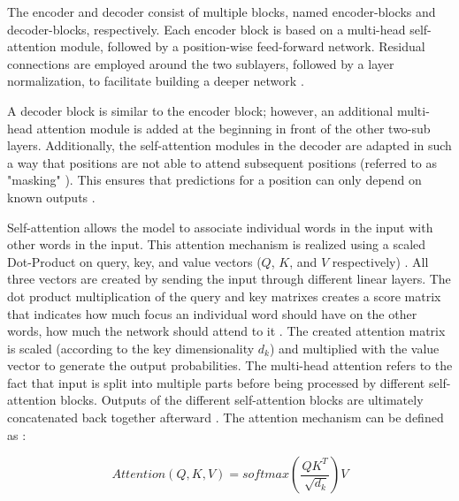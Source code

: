 The encoder and decoder consist of multiple blocks, named encoder-blocks and decoder-blocks, respectively.
Each encoder block is based on a multi-head self-attention module, followed by a position-wise feed-forward network.
Residual connections are employed around the two sublayers, followed by a layer normalization, to facilitate building a deeper network \cite{vaswani2017AttentionAllYou, lin2022SurveyTransformers}.

A decoder block is similar to the encoder block; however, an additional multi-head attention module is added at the beginning in front of the other two-sub layers.
Additionally, the self-attention modules in the decoder are adapted in such a way that positions are not able to attend subsequent positions (referred to as "masking" \cite[p. 3]{vaswani2017AttentionAllYou}).
This ensures that predictions for a position can only depend on known outputs \cite{vaswani2017AttentionAllYou, lin2022SurveyTransformers}.

Self-attention allows the model to associate individual words in the input with other words in the input.
This attention mechanism is realized using a scaled Dot-Product on query, key, and value vectors ($Q$, $K$, and $V$ respectively) \cite{vaswani2017AttentionAllYou}.
All three vectors are created by sending the input through different linear layers.
The dot product multiplication of the query and key matrixes creates a score matrix that indicates how much focus an individual word should have on the other words, \ie how much the network should attend to it \cite{vaswani2017AttentionAllYou}.
The created attention matrix is scaled (according to the key dimensionality $d_k$) and multiplied with the value vector to generate the output probabilities.
The multi-head attention refers to the fact that input is split into multiple parts before being processed by different self-attention blocks.
Outputs of the different self-attention blocks are ultimately concatenated back together afterward \cite{vaswani2017AttentionAllYou}.
The attention mechanism can be defined as \cite[p.4]{vaswani2017AttentionAllYou}:

\begin{equation}
  \label{eqn:attention}
  Attention(Q,K,V)=softmax(\frac{QK^T}{\sqrt[]{d_k}})V
\end{equation}


